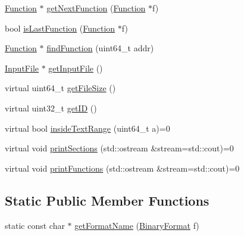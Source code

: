 \begin{DoxyCompactItemize}
\item 
\hyperlink{class_e_p_a_x_1_1_function}{\-Function} $\ast$ \hyperlink{class_e_p_a_x_1_1_base_binary_a5ee395af9e7b93bb91798d15e8d21ce3}{get\-Next\-Function} (\hyperlink{class_e_p_a_x_1_1_function}{\-Function} $\ast$f)
\item 
bool \hyperlink{class_e_p_a_x_1_1_base_binary_a5a1956b1b159ac86cff862a4d74ee507}{is\-Last\-Function} (\hyperlink{class_e_p_a_x_1_1_function}{\-Function} $\ast$f)
\item 
\hyperlink{class_e_p_a_x_1_1_function}{\-Function} $\ast$ \hyperlink{class_e_p_a_x_1_1_base_binary_a2b97925db9ec8c520c4e1c18c8497a46}{find\-Function} (uint64\-\_\-t addr)
\item 
\hyperlink{class_e_p_a_x_1_1_input_file}{\-Input\-File} $\ast$ \hyperlink{class_e_p_a_x_1_1_base_binary_aeb9024c02d54cb2ce202d8387e636ddc}{get\-Input\-File} ()
\item 
virtual uint64\-\_\-t \hyperlink{class_e_p_a_x_1_1_base_binary_a1170c08c3540fdbfca516f4404de0c82}{get\-File\-Size} ()
\item 
virtual uint32\-\_\-t \hyperlink{class_e_p_a_x_1_1_base_binary_a50fc9adca69e89638154291291376dd7}{get\-I\-D} ()
\item 
virtual bool \hyperlink{class_e_p_a_x_1_1_base_binary_aa0f29bfa881c2199911465c64e421be6}{inside\-Text\-Range} (uint64\-\_\-t a)=0
\item 
virtual void \hyperlink{class_e_p_a_x_1_1_base_binary_a9ef8978bbd895a198b68cc04974c57cc}{print\-Sections} (std\-::ostream \&stream=std\-::cout)=0
\item 
virtual void \hyperlink{class_e_p_a_x_1_1_base_binary_a879d43acc68de4f468c26d5cfe4ab59d}{print\-Functions} (std\-::ostream \&stream=std\-::cout)=0
\end{DoxyCompactItemize}
\subsection*{\-Static \-Public \-Member \-Functions}
\begin{DoxyCompactItemize}
\item 
static const char $\ast$ \hyperlink{class_e_p_a_x_1_1_base_binary_a96e7dba2e794a751e8a462e1223bfc20}{get\-Format\-Name} (\hyperlink{namespace_e_p_a_x_a4be639c006ef14def4708b37ee6dd67d}{\-Binary\-Format} f)
\end{DoxyCompactItemize}
